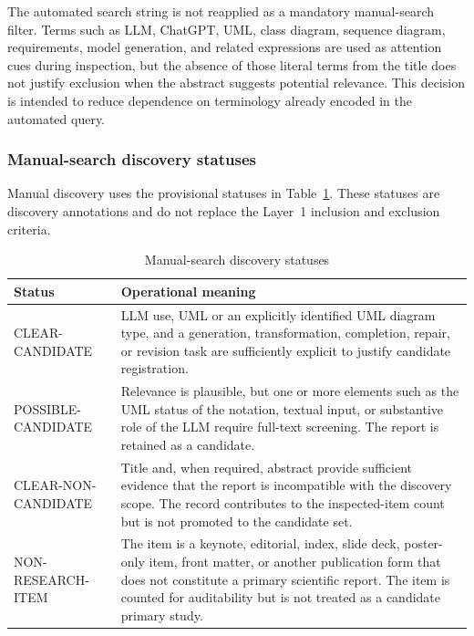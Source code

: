 The automated search string is not reapplied as a mandatory manual-search filter. Terms such as
LLM, ChatGPT, UML, class diagram, sequence diagram, requirements, model generation, and related
expressions are used as attention cues during inspection, but the absence of those literal terms
from the title does not justify exclusion when the abstract suggests potential relevance. This
decision is intended to reduce dependence on terminology already encoded in the automated query.

\subsubsection{Manual-search discovery statuses}

Manual discovery uses the provisional statuses in Table~\ref{tab:manual_discovery_status}.
These statuses are discovery annotations and do not replace the Layer~1 inclusion and exclusion
criteria.

\begin{table}[htbp]
\centering
\small
\caption{Manual-search discovery statuses}
\label{tab:manual_discovery_status}
\begin{tabularx}{\textwidth}{p{} X}
\toprule
\textbf{Status} & \textbf{Operational meaning} \\
\midrule
CLEAR-CANDIDATE & LLM use, UML or an explicitly identified UML diagram type, and a generation, transformation, completion, repair, or revision task are sufficiently explicit to justify candidate registration. \\
POSSIBLE-CANDIDATE & Relevance is plausible, but one or more elements such as the UML status of the notation, textual input, or substantive role of the LLM require full-text screening. The report is retained as a candidate. \\
CLEAR-NON-CANDIDATE & Title and, when required, abstract provide sufficient evidence that the report is incompatible with the discovery scope. The record contributes to the inspected-item count but is not promoted to the candidate set. \\
NON-RESEARCH-ITEM & The item is a keynote, editorial, index, slide deck, poster-only item, front matter, or another publication form that does not constitute a primary scientific report. The item is counted for auditability but is not treated as a candidate primary study. \\
\bottomrule
\end{tabularx}
\end{table}


